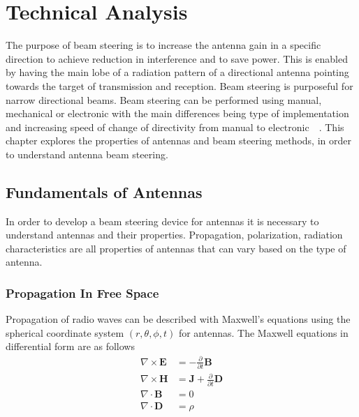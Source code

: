 \chapter{Technical Analysis}
The purpose of beam steering is to increase the antenna gain in a specific direction to achieve reduction in interference and to save power. This is enabled by having the main lobe of a radiation pattern of a directional antenna pointing towards the target of transmission and reception. Beam steering is purposeful for narrow directional beams. Beam steering can be performed using manual, mechanical or electronic with the main differences being type of implementation and increasing speed of change of directivity from manual to electronic~\cite{ieee_beam_steering}~\cite{ieee_microchip_beam_steering}. This chapter explores the properties of antennas and beam steering methods, in order to understand antenna beam steering.

\section{Fundamentals of Antennas}
In order to develop a beam steering device for antennas it is necessary to understand antennas and their properties. Propagation, polarization, radiation characteristics are all properties of antennas that can vary based on the type of antenna.

\subsection{Propagation In Free Space}
Propagation of radio waves can be described with Maxwell's equations using the spherical coordinate system $\left(r, \theta, \phi, t\right)$ for antennas. The Maxwell equations in differential form are as follows
\begin{equation}
    \begin{split}
        \nabla \times \textbf{E} & = - \frac{\partial }{\partial t} \textbf{B} \\
        \nabla \times \textbf{H} & = \textbf{J} + \frac{\partial }{\partial t} \textbf{D} \\
        \nabla \cdot \textbf{B} & = 0 \\
        \nabla \cdot \textbf{D} & = \rho
    \end{split}
\end{equation}

